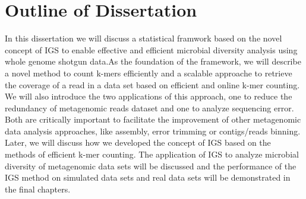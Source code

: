 \section{Outline of Dissertation}
In this dissertation
we will discuss a statistical framwork based on the novel concept of IGS to enable
effective and efficient microbial diversity analysis using whole genome shotgun 
data.As
the foundation of the framework, we will describe a novel method to count k-mers
efficiently and a scalable approache to retrieve the coverage of a read in a 
data set based on efficient and online k-mer counting. We will also introduce the
two applications of this approach, one to reduce the redundancy of metagenomic reads
dataset and one to analyze sequencing error. Both are critically important to 
facilitate the improvement of
other metagenomic data analysis approaches, like
assembly, error trimming or contigs/reads binning. Later, we will discuss
how we developed the concept 
of IGS based on the methods of efficient k-mer counting.  
The application of IGS to analyze microbial diversity of metagenomic data sets 
will be discussed and the performance of the IGS method on simulated data sets and
real data sets will be demonstrated in the final chapters.



